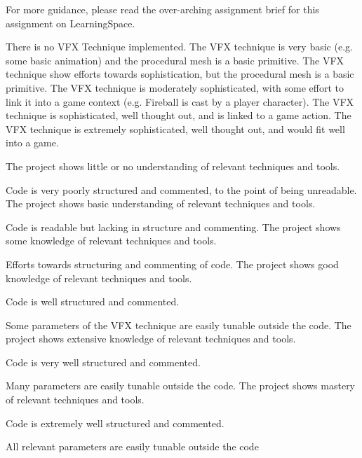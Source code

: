 \documentclass{../../../fal_assignment}
\begin{document}
For more guidance, please read the over-arching assignment brief for this assignment on LearningSpace.

\begin{markingrubric}
        \grade\fail There is no VFX Technique implemented.
		\grade The VFX technique is very basic (e.g. some basic animation) and the procedural mesh is a basic primitive.
		\grade The VFX technique show efforts towards sophistication, but the procedural mesh is a basic primitive.
		\grade The VFX technique is moderately sophisticated, with some effort to link it into a game context (e.g. Fireball is cast by a player character).
		\grade The VFX technique is sophisticated, well thought out, and is linked to a game action.
		\grade The VFX technique is extremely sophisticated, well thought out, and would fit well into a game.

        \grade \fail The project shows little or no understanding of relevant techniques and tools.
			\par Code is very poorly structured and commented, to the point of being unreadable.
        \grade The project shows basic understanding of relevant techniques and tools.
			\par Code is readable but lacking in structure and commenting.
        \grade The project shows some knowledge of relevant techniques and tools.
			\par Efforts towards structuring and commenting of code.
        \grade The project shows good knowledge of relevant techniques and tools.
			\par Code is well structured and commented.
			\par Some parameters of the VFX technique are easily tunable outside the code.
        \grade The project shows extensive knowledge of relevant techniques and tools.
			\par Code is very well structured and commented.
			\par Many parameters are easily tunable outside the code.
        \grade The project shows mastery of relevant techniques and tools.
			\par Code is extremely well structured and commented.
			\par All relevant parameters are easily tunable outside the code
\end{markingrubric}
\end{document}

